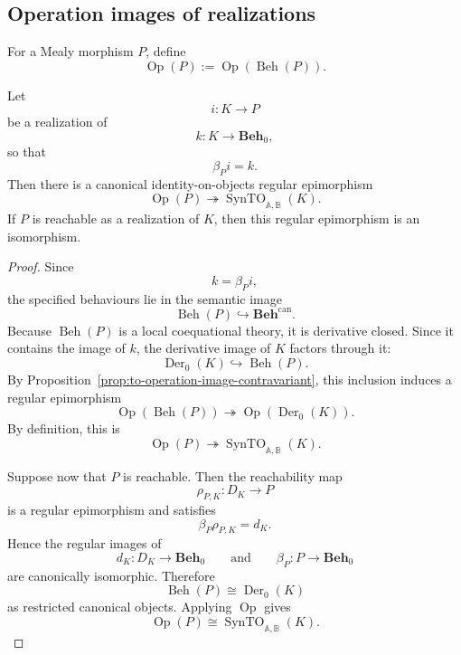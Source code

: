\subsection{Operation images of realizations}
\label{subsec:to-operation-images-mealy-morphisms}

\begin{definition}
\label{def:to-operation-image-mealy-morphism}
    For a Mealy morphism \(P\), define
    \[
        \operatorname{Op}(P)
        :=
        \operatorname{Op}(\operatorname{Beh}(P)).
    \]
\end{definition}

\begin{theorem}
\label{thm:to-mealy-operation-quotient}
    Let
    \[
        i:K\to P
    \]
    be a realization of
    \[
        k:K\to\mathbf{Beh}_0,
    \]
    so that
    \[
        \beta_P i=k.
    \]
    Then there is a canonical identity-on-objects regular epimorphism
    \[
        \operatorname{Op}(P)
        \twoheadrightarrow
        \operatorname{SynTO}_{\mathbb A,\mathbb B}(K).
    \]
    If \(P\) is reachable as a realization of \(K\), then this regular
    epimorphism is an isomorphism.
\end{theorem}

\begin{proof}
    Since
    \[
        k=\beta_Pi,
    \]
    the specified behaviours lie in the semantic image
    \[
        \operatorname{Beh}(P)\hookrightarrow
        \mathbf{Beh}^{\mathrm{can}}.
    \]
    Because \(\operatorname{Beh}(P)\) is a local coequational theory, it is
    derivative closed. Since it contains the image of \(k\), the derivative
    image of \(K\) factors through it:
    \[
        \operatorname{Der}_0(K)\hookrightarrow\operatorname{Beh}(P).
    \]
    By Proposition~\ref{prop:to-operation-image-contravariant}, this inclusion
    induces a regular epimorphism
    \[
        \operatorname{Op}(\operatorname{Beh}(P))
        \twoheadrightarrow
        \operatorname{Op}(\operatorname{Der}_0(K)).
    \]
    By definition, this is
    \[
        \operatorname{Op}(P)
        \twoheadrightarrow
        \operatorname{SynTO}_{\mathbb A,\mathbb B}(K).
    \]

    Suppose now that \(P\) is reachable. Then the reachability map
    \[
        \rho_{P,K}:D_K\to P
    \]
    is a regular epimorphism and satisfies
    \[
        \beta_P\rho_{P,K}=d_K.
    \]
    Hence the regular images of
    \[
        d_K:D_K\to\mathbf{Beh}_0
        \qquad\text{and}\qquad
        \beta_P:P\to\mathbf{Beh}_0
    \]
    are canonically isomorphic. Therefore
    \[
        \operatorname{Beh}(P)\cong \operatorname{Der}_0(K)
    \]
    as restricted canonical objects. Applying \(\operatorname{Op}\) gives
    \[
        \operatorname{Op}(P)
        \cong
        \operatorname{SynTO}_{\mathbb A,\mathbb B}(K).
    \]
\end{proof}


